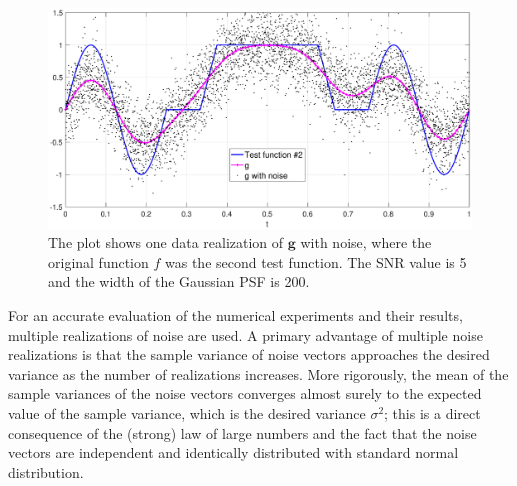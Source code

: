 \documentclass[12pt]{article}
\newcommand{\gdis}{\mathbf{g}}
\newcommand{\fdis}{\mathbf{f}}
\newcommand{\noiseSD}{\sigma}	%
\begin{document}
\begin{figure}
	\centerline{\includegraphics[scale = 0.45]{Figures/NoisePlot1D_F2_S05_W200.eps}}
\caption{The plot shows one data realization of $\gdis$ with noise, where the original function $f$ was the second test function. The SNR value is 5 and the width of the Gaussian PSF is 200.}
\label{NoisePlot1D_F2_S05_W200}
\end{figure}

For an accurate evaluation of the numerical experiments and their results, multiple realizations of noise are used. A primary advantage of multiple noise realizations is that the sample variance of noise vectors approaches the desired variance as the number of realizations increases. More rigorously, the mean of the sample variances of the noise vectors converges almost surely to the expected value of the sample variance, which is the desired variance $\noiseSD^2$; this is a direct consequence of the (strong) law of large numbers and the fact that the noise vectors are independent and identically distributed with standard normal distribution.  \par

\end{document}

